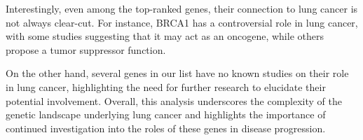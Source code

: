Interestingly, even among the top-ranked genes, their connection to lung cancer is not always clear-cut.
For instance, BRCA1 has a controversial role in lung cancer, with some studies suggesting that it may act as an oncogene,
while others propose a tumor suppressor function.

On the other hand, several genes in our list have no known studies on their role in lung cancer,
highlighting the need for further research to elucidate their potential involvement.
Overall, this analysis underscores the complexity of the genetic landscape underlying lung cancer and
highlights the importance of continued investigation into the roles of these genes in disease progression.